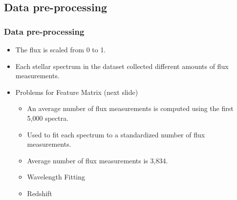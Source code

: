 \documentclass[aspectratio=169]{beamer}
\begin{document}
\subsection{Data pre-processing}
\begin{frame}
\frametitle{Data pre-processing}

\begin{itemize}
\item The flux is scaled from 0 to 1.
\item Each stellar spectrum in the dataset collected different amounts of flux measurements.
\item Problems for Feature Matrix (next slide)
	\begin{itemize}
		\item An average number of flux measurements is computed using the first 5,000 spectra. 
		\item Used to fit each spectrum to a standardized number of flux measurements.
		\item Average number of flux measurements is 3,834.
		\item Wavelength Fitting
		\item Redshift
	\end{itemize}

\end{itemize}
\end{frame}
\end{document}
